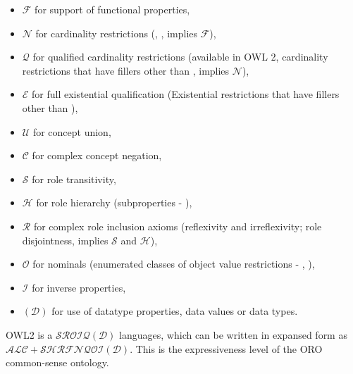 \begin{itemize}
    \item $\mathcal{F}$ for support of functional properties,

    \item $\mathcal{N}$ for cardinality restrictions
    (, , implies
    $\mathcal{F}$),

    \item $\mathcal{Q}$ for qualified cardinality restrictions (available in
    OWL 2, cardinality restrictions that have fillers other than
    , implies $\mathcal{N}$), 

    \item $\mathcal{E}$ for full existential qualification (Existential
    restrictions that have fillers other than ),

    \item $\mathcal{U}$ for concept union,

    \item $\mathcal{C}$ for complex concept negation,

    \item $\mathcal{S}$ for role transitivity,

    \item $\mathcal{H}$ for role hierarchy (subproperties -
    ),

    \item $\mathcal{R}$ for complex role inclusion axioms (reflexivity and
    irreflexivity; role disjointness, implies $\mathcal{S}$ and $\mathcal{H}$),

    \item $\mathcal{O}$ for nominals (enumerated classes of object value
    restrictions - , ),

    \item $\mathcal{I}$ for inverse properties,

    \item $\mathcal{(D)}$ for use of datatype properties, data values or data
    types.

\end{itemize}

OWL2 is a $\mathcal{SROIQ(D)}$ languages, which can be written in expansed form
as $\mathcal{ALC} + \mathcal{SHRFNQOI(D)}$. This is the expressiveness level of
the ORO common-sense ontology.



